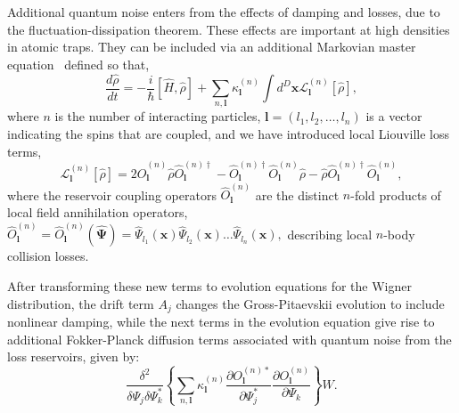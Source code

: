 \documentclass[aps,prl,twocolumn,showpacs,amsmath,amssymb,superscriptaddress,flushbottom,noraggedfooter]{revtex4-1}
\newcommand{\xvec}{\boldsymbol{x}}
\newcommand{\lvec}{\boldsymbol{l}}
\newcommand{\Psivec}{\boldsymbol{\Psi}}
\begin{document}
Additional quantum noise enters from the effects of damping and losses,
due to the fluctuation-dissipation theorem.
These effects are important at high densities in atomic traps.
They can be included via an additional Markovian master equation~\cite{Jack2002}
defined so that,
\begin{equation}
	\frac{d\hat{\rho}}{dt} =
		- \frac{i}{\hbar} \left[ \hat{H}, \hat{\rho} \right]
		+ \sum_{n,\lvec} \kappa_{\lvec}^{(n)} \int d^{D}\xvec
			\mathcal{L}_{\lvec}^{(n)} \left[ \hat{\rho} \right],
\end{equation}
where $n$ is the number of interacting particles,
$\lvec = (l_1, l_2, \ldots, l_n)$ is a vector indicating the spins that are coupled,
and we have introduced local Liouville loss terms,
\begin{equation}
	\mathcal{L}_{\lvec}^{(n)} \left[ \hat{\rho} \right] =
		2\hat{O}_{\lvec}^{(n)} \hat{\rho} \hat{O}_{\lvec}^{(n)\dagger}
		- \hat{O}_{\lvec}^{(n)\dagger} \hat{O}_{\lvec}^{(n)} \hat{\rho}
		- \hat{\rho} \hat{O}_{\lvec}^{(n)\dagger} \hat{O}_{\lvec}^{(n)},
\end{equation}
where the reservoir coupling operators $\hat{O}_{\lvec}^{(n)}$ are the distinct $n$-fold products of local field annihilation operators,
$\hat{O}_{\lvec}^{(n)} = \hat{O}_{\lvec}^{(n)} (\widehat{\Psivec}) =
	\widehat{\Psi}_{l_{1}} (\xvec)
	\widehat{\Psi}_{l_{2}} (\xvec) \ldots
	\widehat{\Psi}_{l_{n}} (\xvec),$
describing local $n$-body collision losses.

After transforming these new terms to evolution equations for the Wigner distribution, the drift term $A_j$
changes the Gross-Pitaevskii evolution to include nonlinear damping, while
the next terms in the evolution equation give rise to additional Fokker-Planck
diffusion terms associated with quantum noise from the loss reservoirs,
given by:
\begin{equation}
	\frac{\delta^{2}}{\delta\Psi_j\delta\Psi_k^{*}} \left\{
		\sum_{n,\lvec} \kappa_{\lvec}^{(n)}
			\frac{\partial O_{\lvec}^{(n)*}}{\partial\Psi_j^{*}}
			\frac{\partial O_{\lvec}^{(n)}}{\partial\Psi_k}
		\right\} W.
\end{equation}
\end{document}

